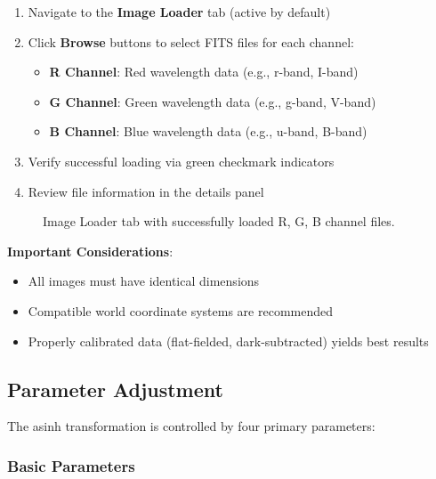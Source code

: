 \documentclass[11pt,a4paper]{article}
\begin{document}
\begin{enumerate}
\item Navigate to the \textbf{Image Loader} tab (active by default)
\item Click \textbf{Browse} buttons to select FITS files for each channel:
   \begin{itemize}
   \item \textbf{R Channel}: Red wavelength data (e.g., r-band, I-band)
   \item \textbf{G Channel}: Green wavelength data (e.g., g-band, V-band)
   \item \textbf{B Channel}: Blue wavelength data (e.g., u-band, B-band)
   \end{itemize}
\item Verify successful loading via green checkmark indicators
\item Review file information in the details panel
\end{enumerate}

\begin{figure}[H]
\centering
\caption{Image Loader tab with successfully loaded R, G, B channel files.}
\label{fig:image-loader}
\end{figure}

\textbf{Important Considerations}:
\begin{itemize}[leftmargin=*]
\item All images must have identical dimensions
\item Compatible world coordinate systems are recommended
\item Properly calibrated data (flat-fielded, dark-subtracted) yields best
results
\end{itemize}

\subsection{Parameter Adjustment}

The asinh transformation is controlled by four primary parameters:

\subsubsection{Basic Parameters}
\end{document}
